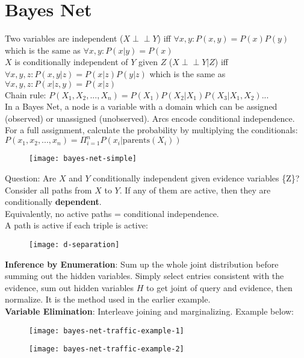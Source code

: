 \newcommand{\ind}{\perp\!\!\!\!\perp}

\section{Bayes Net}
Two variables are independent ($X\ind Y$) iff $\forall x,y: P(x,y)=P(x)P(y)$ which is the same as $\forall x,y: P(x|y)=P(x)$ \\
$X$ is conditionally independent of $Y$ given $Z$ ($X\ind Y|Z$) iff $\forall x,y,z: P(x,y|z)=P(x|z)P(y|z)$ which is the same as $\forall x,y,z: P(x|z,y)=P(x|z)$ \\
Chain rule: $P(X_1,X_2,...,X_n)=P(X_1)P(X_2|X_1)P(X_3|X_1,X_2)...$ \\
In a Bayes Net, a node is a variable with a domain which can be assigned (observed) or unassigned (unobserved). Arcs encode conditional independence. \\
For a full assignment, calculate the probability by multiplying the conditionals: \\
$P(x_1,x_2,...,x_n)=\Pi^{n}_{i=1}P(x_i|\text{parents}(X_i))$ \\
\begin{figure}[H]
\centering
\texttt{[image: bayes-net-simple]}
\end{figure}
Question: Are $X$ and $Y$ conditionally independent given evidence variables \{Z\}? \\
Consider all paths from $X$ to $Y$. If any of them are active, then they are conditionally \textbf{dependent}. \\
Equivalently, no active paths = conditional independence. \\
A path is active if each triple is active: \\
\begin{figure}[H]
\centering
\texttt{[image: d-separation]}
\end{figure}
\textbf{Inference by Enumeration}: Sum up the whole joint distribution before summing out the hidden variables. Simply select entries consistent with the evidence, sum out hidden variables $H$ to get joint of query and evidence, then normalize. It is the method used in the earlier example. \\
\textbf{Variable Elimination}: Interleave joining and marginalizing. Example below:
\begin{figure}[H]
\centering
\texttt{[image: bayes-net-traffic-example-1]}
\end{figure}
\begin{figure}[H]
\centering
\texttt{[image: bayes-net-traffic-example-2]}
\end{figure}
